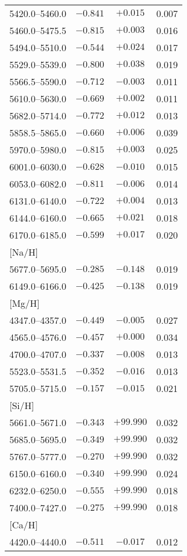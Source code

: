 \documentclass{aa}
\begin{document}
\begin{appendix}
\begin{table}
{\begin{tabular}{lccc}
5420.0--5460.0 & $-0.841$ & $+0.015$ & 0.007 \\
5460.0--5475.5 & $-0.815$ & $+0.003$ & 0.016 \\
5494.0--5510.0 & $-0.544$ & $+0.024$ & 0.017 \\
5529.0--5539.0 & $-0.800$ & $+0.038$ & 0.019 \\
5566.5--5590.0 & $-0.712$ & $-0.003$ & 0.011 \\
5610.0--5630.0 & $-0.669$ & $+0.002$ & 0.011 \\
5682.0--5714.0 & $-0.772$ & $+0.012$ & 0.013 \\
5858.5--5865.0 & $-0.660$ & $+0.006$ & 0.039 \\
5970.0--5980.0 & $-0.815$ & $+0.003$ & 0.025 \\
6001.0--6030.0 & $-0.628$ & $-0.010$ & 0.015 \\
6053.0--6082.0 & $-0.811$ & $-0.006$ & 0.014 \\
6131.0--6140.0 & $-0.722$ & $+0.004$ & 0.013 \\
6144.0--6160.0 & $-0.665$ & $+0.021$ & 0.018 \\
6170.0--6185.0 & $-0.599$ & $+0.017$ & 0.020 \\
\mbox{[Na/H]} \\
5677.0--5695.0 & $-0.285$ & $-0.148$ & 0.019\\
6149.0--6166.0 & $-0.425$ & $-0.138$ & 0.019\\
\mbox{[Mg/H]} \\
4347.0--4357.0 & $-0.449$ & $-0.005$ & 0.027\\
4565.0--4576.0 & $-0.457$ & $+0.000$ & 0.034\\
4700.0--4707.0 & $-0.337$ & $-0.008$ & 0.013\\
5523.0--5531.5 & $-0.352$ & $-0.016$ & 0.013\\
5705.0--5715.0 & $-0.157$ & $-0.015$ & 0.021\\
\mbox{[Si/H]} \\
5661.0--5671.0 & $-0.343$ & $+99.990$ & 0.032\\
5685.0--5695.0 & $-0.349$ & $+99.990$ & 0.032\\
5767.0--5777.0 & $-0.270$ & $+99.990$ & 0.032\\
6150.0--6160.0 & $-0.340$ & $+99.990$ & 0.024\\
6232.0--6250.0 & $-0.555$ & $+99.990$ & 0.018\\
7400.0--7427.0 & $-0.275$ & $+99.990$ & 0.018\\
\mbox{[Ca/H]} \\
4420.0--4440.0 & $-0.511$ & $-0.017$ & 0.012\\

\end{tabular}}
\end{table}
\end{appendix}
\end{document}
